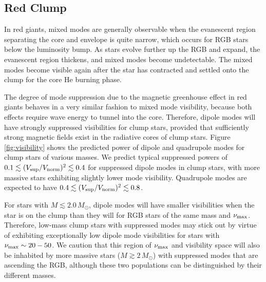 \subsection{Red Clump}
\label{clump}
  

In red giants, mixed modes are generally observable when the evanescent region separating the core and envelope is quite narrow, which occurs for RGB stars below the luminosity bump. As stars evolve further up the RGB and expand, the evanescent region thickens, and mixed modes become undetectable. The mixed modes become visible again after the star has contracted and settled onto the clump for the core He burning phase. 

The degree of mode suppression due to the magnetic greenhouse effect in red giants behaves in a very similar fashion to mixed mode visibility, because both effects require wave energy to tunnel into the core. Therefore, dipole modes will have strongly suppressed visibilities for clump stars, provided that sufficiently strong magnetic fields exist in the radiative cores of clump stars. Figure \ref{fig:visibility} shows the predicted power of dipole and quadrupole modes for clump stars of various masses. We predict typical suppressed powers of $0.1 \lesssim (V_{\rm sup}/V_{\rm norm})^2 \lesssim 0.4$ for suppressed dipole modes in clump stars, with more massive stars exhibiting slightly lower mode visibility. Quadrupole modes are expected to have $0.4 \lesssim (V_{\rm sup}/V_{\rm norm})^2 \lesssim 0.8$. 

For stars with $M \lesssim 2.0 \, M_\odot$, dipole modes will have smaller visibilities when the star is on the clump than they will for RGB stars of the same mass and $\nu_{\rm max}$. Therefore, low-mass clump stars with suppressed modes may stick out by virtue of exhibiting exceptionally low dipole mode visibilities for stars with $\nu_{\rm max} \sim 20-50$. We caution that this region of $\nu_{\rm max}$ and visibility space will also be inhabited by more massive stars ($M \gtrsim 2 \, M_\odot$) with suppressed modes that are ascending the RGB, although these two populations can be distinguished by their different masses. 
  
  